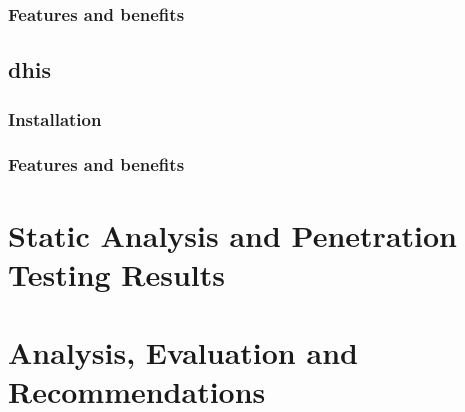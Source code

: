 \documentclass[11pt,english,a4paper]{report}
\begin{document}
\subsection{Features and benefits}
\section{\gls{dhis}}
\subsection{Installation}
\subsection{Features and benefits}



\chapter{Static Analysis and Penetration Testing Results}
\chapter{Analysis, Evaluation and Recommendations}
\end{document}
